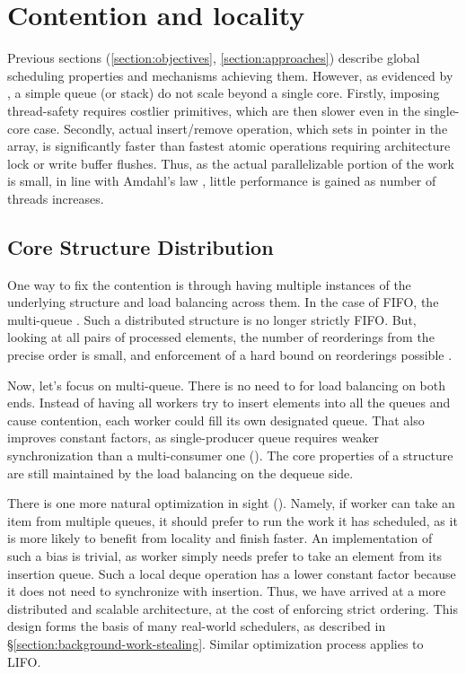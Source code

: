 \documentclass[12pt,a4paper,twoside]{report}
\begin{document}
\section{Contention and locality}
\label{section:global_local}


Previous sections (\ref{section:objectives}, \ref{section:approaches}) describe global scheduling properties and mechanisms achieving them. However, as evidenced by , a simple queue (or stack) do not scale beyond a single core. Firstly, imposing thread-safety requires costlier primitives, which are then slower even in the single-core case.
Secondly, actual insert/remove operation, which sets in pointer in the array, is significantly faster than fastest atomic operations requiring architecture lock or write buffer flushes. Thus, as the actual parallelizable portion of the work is small, in line with Amdahl's law \cite{amdahl}, little performance is gained as number of threads increases. 

\subsection{Core Structure Distribution}
\label{section:core_struct_dist}

One way to fix the contention is through having multiple instances of the underlying structure and load balancing across them. In the case of FIFO, the multi-queue \cite{Postnikova2022}. Such a distributed structure is no longer strictly FIFO. But, looking at all pairs of processed elements, the number of reorderings from the precise order is small, and enforcement of a hard bound on reorderings possible \cite{Kirsch2013}. 

Now, let's focus on multi-queue. There is no need to for load balancing on both ends. Instead of having all workers try to insert elements into all the queues and cause contention, each worker could fill its own designated queue. That also improves constant factors, as single-producer queue requires weaker synchronization than a multi-consumer one (). The core properties of a structure are still maintained by the load balancing on the dequeue side. 

There is one more natural optimization in sight (). Namely, if worker can take an item from multiple queues, it should prefer to run the work it has scheduled, as it is more likely to benefit from locality and finish faster. An implementation of such a bias is trivial, as worker simply needs prefer to take an element from its insertion queue. Such a local deque operation has a lower constant factor because it does not need to synchronize with insertion. Thus, we have arrived at a more distributed and scalable architecture, at the cost of enforcing strict ordering. This design forms the basis of many real-world schedulers, as described in \S\ref{section:background-work-stealing}. Similar optimization process applies to LIFO. 
\end{document}
